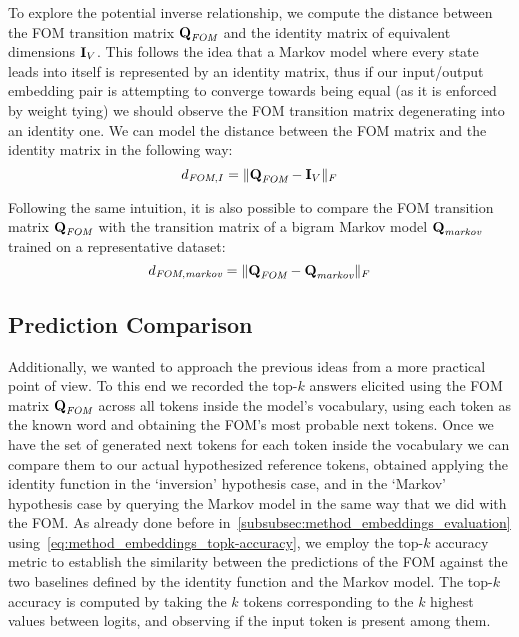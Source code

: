 To explore the potential inverse relationship, we compute the distance between the FOM transition matrix $\bm{\mathbf{Q}}_{\textit{FOM}}$ and the identity matrix of equivalent dimensions $\bm{\mathbf{I}}_V$.
This follows the idea that a Markov model where every state leads into itself is represented by an identity matrix, thus if our input/output embedding pair is attempting to converge towards being equal (as it is enforced by weight tying) we should observe the FOM transition matrix degenerating into an identity one.
We can model the distance between the FOM matrix and the identity matrix in the following way:
\begin{equation}
    \label{eq:method_fom_fom-i-comp}
    d_{\textit{FOM},I} = \| \bm{\mathbf{Q}}_{\textit{FOM}} - \bm{\mathbf{I}}_V \|_F
\end{equation}

Following the same intuition, it is also possible to compare the FOM transition matrix $\bm{\mathbf{Q}}_{\textit{FOM}}$ with the transition matrix of a bigram Markov model $\bm{\mathbf{Q}}_{\textit{markov}}$ trained on a representative dataset:
\begin{equation}
    \label{eq:method_fom_fom-markov-comp}
    d_{\textit{FOM},\textit{markov}} = \| \bm{\mathbf{Q}}_{\textit{FOM}} - \bm{\mathbf{Q}}_{\textit{markov}} \|_F
\end{equation}

\subsection{Prediction Comparison}\label{ssec:method_fom_pred}

Additionally, we wanted to approach the previous ideas from a more practical point of view.
To this end we recorded the top-$k$ answers elicited using the FOM matrix $\bm{\mathbf{Q}}_{\textit{FOM}}$ across all tokens inside the model's vocabulary, using each token as the known word and obtaining the FOM's most probable next tokens.
Once we have the set of generated next tokens for each token inside the vocabulary we can compare them to our actual hypothesized reference tokens, obtained applying the identity function in the `inversion' hypothesis case, and in the `Markov' hypothesis case by querying the Markov model in the same way that we did with the FOM\@.
As already done before in~\cref{subsubsec:method_embeddings_evaluation} using~\cref{eq:method_embeddings_topk-accuracy}, we employ the top-$k$ accuracy metric to establish the similarity between the predictions of the FOM against the two baselines defined by the identity function and the Markov model.
The top-$k$ accuracy is computed by taking the $k$ tokens corresponding to the $k$ highest values between logits, and observing if the input token is present among them.

